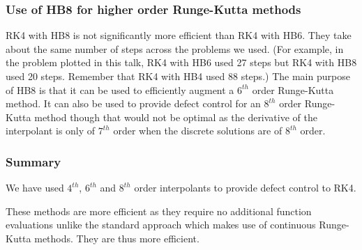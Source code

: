\documentclass{beamer}
\begin{document}
\begin{frame}
\frametitle{Use of HB8 for higher order Runge-Kutta methods}
RK4 with HB8 is not significantly more efficient than RK4 with HB6. They take about the same number of steps across the problems we used. (For example, in the problem plotted in this talk, RK4 with HB6 used 27 steps but RK4 with HB8 used 20 steps. Remember that RK4 with HB4 used 88 steps.)
\newline \newline
The main purpose of HB8 is that it can be used to efficiently augment a $6^{th}$ order Runge-Kutta method.
\newline \newline
It can also be used to provide defect control for an $8^{th}$ order Runge-Kutta method though that would not be optimal as the derivative of the interpolant is only of $7^{th}$ order when the discrete solutions are of $8^{th}$ order. 
\end{frame}

\begin{frame}
\frametitle{Summary}

We have used $4^{th}$, $6^{th}$ and $8^{th}$ order interpolants to provide defect control to RK4.

These methods are more efficient as they require no additional function evaluations unlike the standard approach which makes use of continuous Runge-Kutta methods.
They are thus more efficient.

\end{frame}
\end{document}
